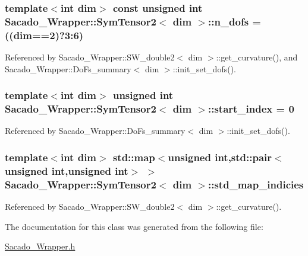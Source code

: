 \subsubsection[{\texorpdfstring{n\+\_\+dofs}{n_dofs}}]{\setlength{\rightskip}{0pt plus 5cm}template$<$int dim$>$ const unsigned int {\bf Sacado\+\_\+\+Wrapper\+::\+Sym\+Tensor2}$<$ dim $>$\+::n\+\_\+dofs = ((dim==2)?3\+:6)\hspace{0.3cm}{\ttfamily [static]}}\hypertarget{classSacado__Wrapper_1_1SymTensor2_ad9d6542de5481e0d41bd1831cb0aeaff}{}\label{classSacado__Wrapper_1_1SymTensor2_ad9d6542de5481e0d41bd1831cb0aeaff}


Referenced by Sacado\+\_\+\+Wrapper\+::\+S\+W\+\_\+double2$<$ dim $>$\+::get\+\_\+curvature(), and Sacado\+\_\+\+Wrapper\+::\+Do\+Fs\+\_\+summary$<$ dim $>$\+::init\+\_\+set\+\_\+dofs().

\subsubsection[{\texorpdfstring{start\+\_\+index}{start_index}}]{\setlength{\rightskip}{0pt plus 5cm}template$<$int dim$>$ unsigned int {\bf Sacado\+\_\+\+Wrapper\+::\+Sym\+Tensor2}$<$ dim $>$\+::start\+\_\+index = 0}\hypertarget{classSacado__Wrapper_1_1SymTensor2_ab14d036243a7505e918af354b1cb74d9}{}\label{classSacado__Wrapper_1_1SymTensor2_ab14d036243a7505e918af354b1cb74d9}


Referenced by Sacado\+\_\+\+Wrapper\+::\+Do\+Fs\+\_\+summary$<$ dim $>$\+::init\+\_\+set\+\_\+dofs().

\subsubsection[{\texorpdfstring{std\+\_\+map\+\_\+indicies}{std_map_indicies}}]{\setlength{\rightskip}{0pt plus 5cm}template$<$int dim$>$ std\+::map$<$unsigned int,std\+::pair$<$unsigned int,unsigned int$>$ $>$ {\bf Sacado\+\_\+\+Wrapper\+::\+Sym\+Tensor2}$<$ dim $>$\+::std\+\_\+map\+\_\+indicies}\hypertarget{classSacado__Wrapper_1_1SymTensor2_a1c6b89438714315ae209f4687b687505}{}\label{classSacado__Wrapper_1_1SymTensor2_a1c6b89438714315ae209f4687b687505}


Referenced by Sacado\+\_\+\+Wrapper\+::\+S\+W\+\_\+double2$<$ dim $>$\+::get\+\_\+curvature().



The documentation for this class was generated from the following file\+:\begin{DoxyCompactItemize}
\item 
\hyperlink{Sacado__Wrapper_8h}{Sacado\+\_\+\+Wrapper.\+h}\end{DoxyCompactItemize}
